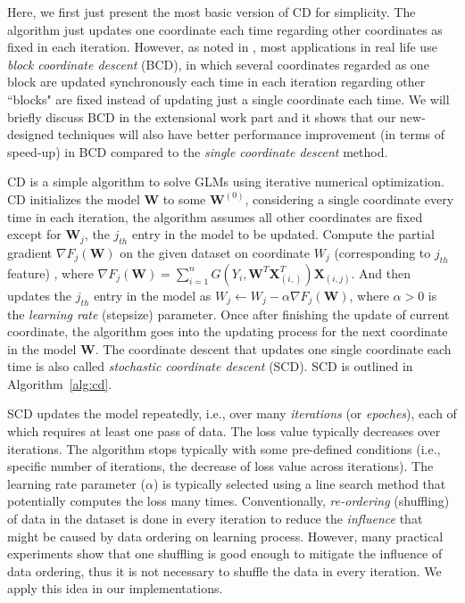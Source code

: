 \documentclass{vldb}
\begin{document}
Here, we first just present the most basic version of CD for simplicity. The algorithm just updates one coordinate each time 
regarding other coordinates as fixed in each iteration. However, as noted in \cite{Wright}, most applications in real life use \textit{block coordinate descent} (BCD),
in which several coordinates regarded as one block are updated synchronously each time in each iteration regarding other ``blocks" are fixed 
instead of updating just a single coordinate each time. We will briefly discuss BCD in the extensional work part and it shows that our 
new-designed techniques will also have better performance improvement (in terms of speed-up) in BCD compared to the \textit{single coordinate descent} method.

CD is a simple algorithm to solve GLMs using iterative numerical optimization. CD initializes the model $\textbf{W}$ to some $\textbf{W}^{(0)}$, 
considering a single coordinate every time in each iteration, the algorithm assumes all other coordinates are fixed except for $\textbf{W}_j$, the $j_{th}$ entry in the model to be updated. Compute the partial gradient $\nabla F_j(\textbf{W})$ on the given dataset on coordinate $W_j$ (corresponding to $j_{th}$ feature) , where 
$\nabla F_j(\textbf{W}) = \sum_{i=1}^{n}{G(Y_i, \textbf{W}^T\textbf{X}_{(i,)}^T)}\textbf{X}_{(i,j)}$. And then updates the $j_{th}$ entry in the model as $W_j \leftarrow W_j - 
\alpha \nabla F_j(\textbf{W})$, where $\alpha > 0$ is the \textit{learning rate} (stepsize) parameter. Once after finishing the update of current coordinate, the algorithm goes into the updating process for the next coordinate in the model $\textbf{W}$. The coordinate descent that updates one single coordinate each time is also called 
\textit{stochastic coordinate descent} (SCD). SCD is outlined in Algorithm~\ref{alg:cd}. 

SCD updates the model repeatedly, i.e., over many \textit{iterations} (or \textit{epoches}), each of which requires at least one pass of data. The loss value typically decreases over iterations. The algorithm stops typically with some pre-defined conditions (i.e., specific number of iterations, the decrease of loss value across iterations). The learning rate parameter ($\alpha$) is typically selected using a line search method that potentially computes the loss many times. Conventionally, \textit{re-ordering} (shuffling) of data in the dataset is done in every iteration to reduce the \textit{influence} that might be caused by data ordering on learning process. However, many practical 
experiments show that one shuffling is good enough to mitigate the influence of data ordering, thus it is not necessary to shuffle the data in every iteration. We apply this 
idea in our implementations.
\end{document}
